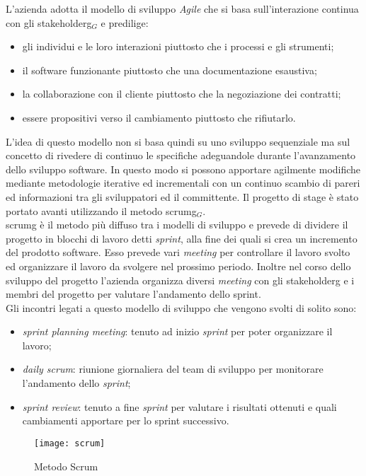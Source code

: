 L'azienda adotta il modello di sviluppo \textit{Agile} che si basa sull'interazione continua con gli \gls{stakeholderg}$_G$ e predilige:
\begin{itemize}
	\item gli individui e le loro interazioni piuttosto che i processi e gli strumenti;
	\item il software funzionante piuttosto che una documentazione esaustiva;
	\item la collaborazione con il cliente piuttosto che la negoziazione dei contratti;
	\item essere propositivi verso il cambiamento piuttosto che rifiutarlo.
\end{itemize}
L'idea di questo modello non si basa quindi su uno sviluppo sequenziale ma sul concetto di rivedere di continuo le specifiche adeguandole durante l'avanzamento dello sviluppo software. In questo modo si possono apportare agilmente modifiche mediante metodologie iterative ed incrementali con un continuo scambio di pareri ed informazioni tra gli sviluppatori ed il committente. Il progetto di stage è stato portato avanti utilizzando il metodo \gls{scrumg}$_G$.\\
\gls{scrumg} è il metodo più diffuso tra i modelli di sviluppo e prevede di dividere il progetto in blocchi di lavoro detti \textit{sprint}, alla fine dei quali si crea un incremento del prodotto software. Esso prevede vari \textit{meeting} per controllare il lavoro svolto ed organizzare il lavoro da svolgere nel prossimo periodo. Inoltre nel corso dello sviluppo del progetto l'azienda organizza diversi \textit{meeting} con gli \gls{stakeholderg} e i membri del progetto per valutare l'andamento dello sprint.\\
Gli incontri legati a questo modello di sviluppo che vengono svolti di solito sono:
\begin{itemize}
	\item \textit{sprint planning meeting}: tenuto ad inizio \textit{sprint} per poter organizzare il lavoro;
	\item \textit{daily scrum}: riunione giornaliera del team di sviluppo per monitorare l'andamento dello \textit{sprint};
	\item \textit{sprint review}: tenuto a fine \textit{sprint} per valutare i risultati ottenuti e quali cambiamenti apportare per lo sprint successivo.
\end{itemize}
\begin{figure}[H]
	\begin{center}
		\texttt{[image: scrum]}
		\caption{Metodo Scrum}
	\end{center}
\end{figure}

